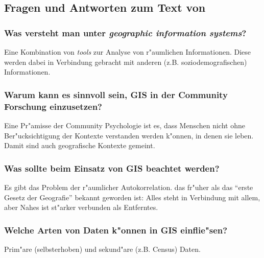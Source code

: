 \subsection{Fragen und Antworten zum Text von \textcite{morton_applying_2012}}
\subsubsection{Was versteht man unter \emph{geographic information systems}?}
Eine Kombination von \emph{tools} zur Analyse von r"aumlichen Informationen. Diese werden dabei in Verbindung gebracht mit anderen (z.B. soziodemografischen) Informationen.

\subsubsection{Warum kann es sinnvoll sein, GIS in der Community Forschung einzusetzen?}
Eine Pr"amisse der Community Psychologie ist es, dass Menschen nicht ohne Ber"ucksichtigung der Kontexte verstanden werden k"onnen, in denen sie leben. Damit sind auch geografische Kontexte gemeint.

\subsubsection{Was sollte beim Einsatz von GIS beachtet werden?}
Es gibt das Problem der r"aumlicher Autokorrelation. das fr"uher als das ``erste Gesetz der Geografie'' bekannt geworden ist: Alles steht in Verbindung mit allem, aber Nahes ist st"arker verbunden als Entferntes.

\subsubsection{Welche Arten von Daten k"onnen in GIS einflie"sen?}
Prim"are (selbsterhoben) und sekund"are (z.B. Census) Daten.

